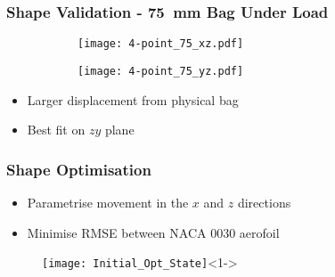 \documentclass[serif, pdf]{beamer}
\begin{document}

\begin{frame}
\frametitle{Shape Validation - 75~mm Bag Under Load}
\begin{figure}[h!]
\begin{subfigure}{.5\textwidth}
  \centering
  \texttt{[image: 4-point\_75\_xz.pdf]}
  \label{fig:Point_Cloud_75_4-Point_xz}
\end{subfigure}%
\begin{subfigure}{.5\textwidth}
  \centering
  \texttt{[image: 4-point\_75\_yz.pdf]}
  \label{fig:Point_Cloud_75_4-Point_yz}
\end{subfigure}
\end{figure}
\begin{itemize}
\item Larger displacement from physical bag
\item Best fit on $zy$ plane
\end{itemize}
\end{frame}




\begin{frame}
\frametitle{Shape Optimisation}
\begin{center}
\begin{itemize}
\item<1-> Parametrise movement in the $x$ and $z$ directions 
\item<2-> Minimise RMSE between NACA 0030 aerofoil
\end{itemize}
\end{center}

\begin{figure}
\texttt{[image: Initial\_Opt\_State]}<1->
\end{figure}
\end{frame}

\end{document}
